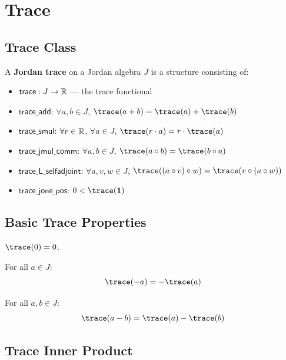 \section{Trace}

\subsection{Trace Class}

\begin{definition}[JordanTrace]
A \textbf{Jordan trace} on a Jordan algebra $J$ is a structure consisting of:
\begin{itemize}
  \item $\mathsf{trace} : J \to \mathbb{R}$ --- the trace functional
  \item $\mathsf{trace\_add}$: $\forall a, b \in J$, $\trace(a + b) = \trace(a) + \trace(b)$
  \item $\mathsf{trace\_smul}$: $\forall r \in \mathbb{R}$, $\forall a \in J$, $\trace(r \cdot a) = r \cdot \trace(a)$
  \item $\mathsf{trace\_jmul\_comm}$: $\forall a, b \in J$, $\trace(a \jmul b) = \trace(b \jmul a)$
  \item $\mathsf{trace\_L\_selfadjoint}$: $\forall a, v, w \in J$, $\trace((a \jmul v) \jmul w) = \trace(v \jmul (a \jmul w))$
  \item $\mathsf{trace\_jone\_pos}$: $0 < \trace(\jone)$
\end{itemize}
\end{definition}

\subsection{Basic Trace Properties}

\begin{theorem}
$\trace(0) = 0$.
\end{theorem}

\begin{theorem}
For all $a \in J$:
\[ \trace(-a) = -\trace(a) \]
\end{theorem}

\begin{theorem}
For all $a, b \in J$:
\[ \trace(a - b) = \trace(a) - \trace(b) \]
\end{theorem}

\subsection{Trace Inner Product}

